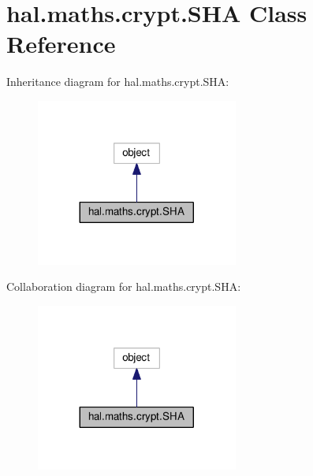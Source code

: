 \hypertarget{classhal_1_1maths_1_1crypt_1_1_s_h_a}{}\section{hal.\+maths.\+crypt.\+S\+HA Class Reference}
\label{classhal_1_1maths_1_1crypt_1_1_s_h_a}


Inheritance diagram for hal.\+maths.\+crypt.\+S\+HA\+:
\nopagebreak
\begin{figure}[H]
\begin{center}
\leavevmode
\includegraphics[width=188pt]{classhal_1_1maths_1_1crypt_1_1_s_h_a__inherit__graph}
\end{center}
\end{figure}


Collaboration diagram for hal.\+maths.\+crypt.\+S\+HA\+:
\nopagebreak
\begin{figure}[H]
\begin{center}
\leavevmode
\includegraphics[width=188pt]{classhal_1_1maths_1_1crypt_1_1_s_h_a__coll__graph}
\end{center}
\end{figure}

